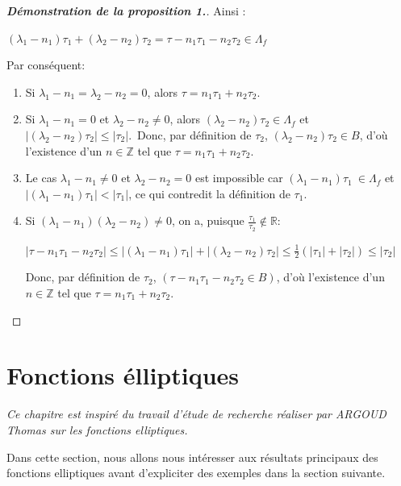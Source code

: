 \documentclass[12pt]{article}
\begin{document}
\begin{proof}[\textbf{Démonstration de la proposition 1.}]
    Ainsi :
    
    \((\lambda_1 - n_1)\tau_1 + (\lambda_2 - n_2)\tau_2 = \tau - n_1\tau_1 - n_2\tau_2 \in \Lambda_f\)
    
    
    Par conséquent:
    \begin{enumerate}
    \item Si \(\lambda_1 - n_1 = \lambda_2 - n_2 = 0\), alors \(\tau = n_1\tau_1 + n_2\tau_2\).
    \item Si \(\lambda_1 - n_1 = 0\) et \(\lambda_2 - n_2 \neq 0\), alors \((\lambda_2 - n_2)\tau_2 \in \Lambda_f\) et \(\left|(\lambda_2 - n_2)\tau_2\right| \leq |\tau_2|\).\
    Donc, par définition de \(\tau_2\), \((\lambda_2 - n_2)\tau_2 \in B\), d’où l’existence d’un \(n \in \mathbb{Z}\) tel que \(\tau = n_1\tau_1 + n_2\tau_2\).
    \item Le cas \(\lambda_1 - n_1 \neq 0\) et \(\lambda_2 - n_2 = 0\) est impossible car \((\lambda_1 - n_1)\tau_1\ \in \Lambda_f\) et \(\left|(\lambda_1 - n_1)\tau_1\right| < |\tau_1|\), ce qui contredit la définition de \(\tau_1\).
    \item Si \((\lambda_1 - n_1)(\lambda_2 - n_2) \neq 0\), on a, puisque \(\frac{\tau_1}{\tau_2} \notin \mathbb{R}\):
    
    \(\left|\tau - n_1\tau_1 - n_2\tau_2\right| \leq \left|(\lambda_1 - n_1)\tau_1\right| + \left|(\lambda_2 - n_2)\tau_2\right| \leq \frac{1}{2}\left(|\tau_1| + |\tau_2|\right) \leq |\tau_2|\)
    
    Donc, par définition de \(\tau_2\), \((\tau -n_1\tau_1 - n_2\tau_2 \in B)\), d’où l’existence d’un \(n \in \mathbb{Z}\) tel que \(\tau = n_1\tau_1 + n_2\tau_2\).
    \end{enumerate}

\end{proof}



    \section{Fonctions élliptiques}
    \textit{Ce  chapitre est inspiré du travail d'étude de recherche réaliser par ARGOUD Thomas  sur les fonctions elliptiques.}

    Dans cette section, nous allons nous intéresser aux résultats principaux des fonctions elliptiques avant d’expliciter des exemples dans la section suivante.
\end{document}
